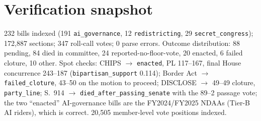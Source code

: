\documentclass[11pt]{article}
\newcommand{\code}[1]{\texttt{#1}}
\begin{document}
\section*{Verification snapshot}

232 bills indexed (191 \code{ai\_governance}, 12 \code{redistricting}, 29
\code{secret\_congress}); 172{,}887 sections; 347 roll-call votes; 0 parse
errors. Outcome distribution: 88 pending, 84 died in committee, 24
reported-no-floor-vote, 20 enacted, 6 failed cloture, 10 other. Spot
checks: CHIPS $\to$ \code{enacted}, PL 117--167, final House concurrence
243--187 (\code{bipartisan\_support} 0.114); Border Act $\to$
\code{failed\_cloture}, 43--50 on the motion to proceed; DISCLOSE $\to$
49--49 cloture, \code{party\_line}; S.~914 $\to$
\code{died\_after\_passing\_senate} with the 89--2 passage vote; the two
``enacted'' AI-governance bills are the FY2024/FY2025 NDAAs (Tier-B AI
riders), which is correct. 20{,}505 member-level vote positions indexed.
\end{document}

